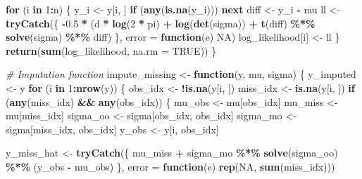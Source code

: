 \documentclass[
]{article}
\newenvironment{Shaded}{\begin{snugshade}}{\end{snugshade}}
\newcommand{\AttributeTok}[1]{\textcolor[rgb]{0.13,0.29,0.53}{#1}}
\newcommand{\CommentTok}[1]{\textcolor[rgb]{0.56,0.35,0.01}{\textit{#1}}}
\newcommand{\ConstantTok}[1]{\textcolor[rgb]{0.56,0.35,0.01}{#1}}
\newcommand{\ControlFlowTok}[1]{\textcolor[rgb]{0.13,0.29,0.53}{\textbf{#1}}}
\newcommand{\DecValTok}[1]{\textcolor[rgb]{0.00,0.00,0.81}{#1}}
\newcommand{\FloatTok}[1]{\textcolor[rgb]{0.00,0.00,0.81}{#1}}
\newcommand{\FunctionTok}[1]{\textcolor[rgb]{0.13,0.29,0.53}{\textbf{#1}}}
\newcommand{\NormalTok}[1]{#1}
\newcommand{\OtherTok}[1]{\textcolor[rgb]{0.56,0.35,0.01}{#1}}
\newcommand{\SpecialCharTok}[1]{\textcolor[rgb]{0.81,0.36,0.00}{\textbf{#1}}}
\begin{document}
\begin{Shaded}
\begin{Highlighting}[]
  \ControlFlowTok{for}\NormalTok{ (i }\ControlFlowTok{in} \DecValTok{1}\SpecialCharTok{:}\NormalTok{n) \{}
\NormalTok{    y\_i }\OtherTok{\textless{}{-}}\NormalTok{ y[i, ]}
    \ControlFlowTok{if}\NormalTok{ (}\FunctionTok{any}\NormalTok{(}\FunctionTok{is.na}\NormalTok{(y\_i))) }\ControlFlowTok{next}
\NormalTok{    diff }\OtherTok{\textless{}{-}}\NormalTok{ y\_i }\SpecialCharTok{{-}}\NormalTok{ mu}
\NormalTok{    ll }\OtherTok{\textless{}{-}} \FunctionTok{tryCatch}\NormalTok{(\{}
      \SpecialCharTok{{-}}\FloatTok{0.5} \SpecialCharTok{*}\NormalTok{ (d }\SpecialCharTok{*} \FunctionTok{log}\NormalTok{(}\DecValTok{2} \SpecialCharTok{*}\NormalTok{ pi) }\SpecialCharTok{+} \FunctionTok{log}\NormalTok{(}\FunctionTok{det}\NormalTok{(sigma)) }\SpecialCharTok{+}
                \FunctionTok{t}\NormalTok{(diff) }\SpecialCharTok{\%*\%} \FunctionTok{solve}\NormalTok{(sigma) }\SpecialCharTok{\%*\%}\NormalTok{ diff)}
\NormalTok{    \}, }\AttributeTok{error =} \ControlFlowTok{function}\NormalTok{(e) }\ConstantTok{NA}\NormalTok{)}
\NormalTok{    log\_likelihood[i] }\OtherTok{\textless{}{-}}\NormalTok{ ll}
\NormalTok{  \}}
  \FunctionTok{return}\NormalTok{(}\FunctionTok{sum}\NormalTok{(log\_likelihood, }\AttributeTok{na.rm =} \ConstantTok{TRUE}\NormalTok{))}
\NormalTok{\}}

\CommentTok{\# Imputation function}
\NormalTok{impute\_missing }\OtherTok{\textless{}{-}} \ControlFlowTok{function}\NormalTok{(y, mu, sigma) \{}
\NormalTok{  y\_imputed }\OtherTok{\textless{}{-}}\NormalTok{ y}
  \ControlFlowTok{for}\NormalTok{ (i }\ControlFlowTok{in} \DecValTok{1}\SpecialCharTok{:}\FunctionTok{nrow}\NormalTok{(y)) \{}
\NormalTok{    obs\_idx }\OtherTok{\textless{}{-}} \SpecialCharTok{!}\FunctionTok{is.na}\NormalTok{(y[i, ])}
\NormalTok{    miss\_idx }\OtherTok{\textless{}{-}} \FunctionTok{is.na}\NormalTok{(y[i, ])}
    \ControlFlowTok{if}\NormalTok{ (}\FunctionTok{any}\NormalTok{(miss\_idx) }\SpecialCharTok{\&\&} \FunctionTok{any}\NormalTok{(obs\_idx)) \{}
\NormalTok{      mu\_obs }\OtherTok{\textless{}{-}}\NormalTok{ mu[obs\_idx]}
\NormalTok{      mu\_miss }\OtherTok{\textless{}{-}}\NormalTok{ mu[miss\_idx]}
\NormalTok{      sigma\_oo }\OtherTok{\textless{}{-}}\NormalTok{ sigma[obs\_idx, obs\_idx]}
\NormalTok{      sigma\_mo }\OtherTok{\textless{}{-}}\NormalTok{ sigma[miss\_idx, obs\_idx]}
\NormalTok{      y\_obs }\OtherTok{\textless{}{-}}\NormalTok{ y[i, obs\_idx]}

\NormalTok{      y\_miss\_hat }\OtherTok{\textless{}{-}} \FunctionTok{tryCatch}\NormalTok{(\{}
\NormalTok{        mu\_miss }\SpecialCharTok{+}\NormalTok{ sigma\_mo }\SpecialCharTok{\%*\%} \FunctionTok{solve}\NormalTok{(sigma\_oo) }\SpecialCharTok{\%*\%}\NormalTok{ (y\_obs }\SpecialCharTok{{-}}\NormalTok{ mu\_obs)}
\NormalTok{      \}, }\AttributeTok{error =} \ControlFlowTok{function}\NormalTok{(e) }\FunctionTok{rep}\NormalTok{(}\ConstantTok{NA}\NormalTok{, }\FunctionTok{sum}\NormalTok{(miss\_idx)))}


\end{Highlighting}
\end{Shaded}
\end{document}
